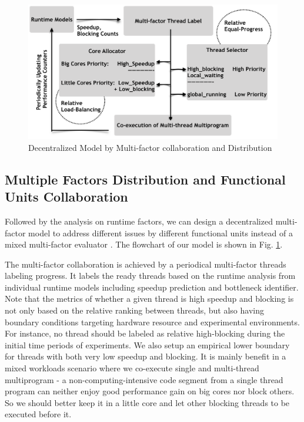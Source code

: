 \documentclass[sigplan,review,anonymous]{acmart}\settopmatter{printfolios=true,printccs=false,printacmref=false}
\begin{document}
\begin{figure}
\centering
\includegraphics[scale=0.4]{figures/mfm.png}
\caption{Decentralized Model by Multi-factor collaboration and Distribution}
\label{figure:f2}
\end{figure} 

\subsection{Multiple Factors Distribution and Functional Units Collaboration}
Followed by the analysis on runtime factors, we can design a decentralized multi-factor model to address different issues by different functional units instead of a mixed multi-factor evaluator \cite{jibaja2016portable}.
The flowchart of our model is shown in Fig. \ref{figure:f2}. 

The multi-factor collaboration is achieved by a periodical multi-factor threads labeling progress. It labels the ready threads based on the runtime analysis from individual runtime models including speedup prediction and bottleneck identifier. Note that the metrics of whether a given thread is high speedup and blocking is not only based on the relative ranking between threads, but also having boundary conditions targeting hardware resource and experimental environments. For instance, no thread should be labeled as relative high-blocking during the initial time periods of experiments. We also setup an empirical lower boundary for threads with both very low speedup and blocking. It is mainly benefit in a mixed workloads scenario where we co-execute single and multi-thread multiprogram - a non-computing-intensive code segment from a single thread program can neither enjoy good performance gain on big cores nor block others. So we should better keep it in a little core and let other blocking threads to be executed before it. 
\end{document}
